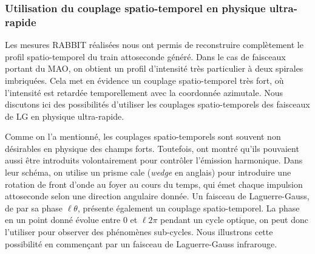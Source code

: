 \subsubsection{Utilisation du couplage spatio-temporel en physique ultra-rapide}
Les mesures RABBIT réalisées nous ont permis de reconstruire complètement le profil spatio-temporel du train attoseconde généré. Dans le cas de faisceaux portant du MAO, on obtient un profil d'intensité très particulier à deux spirales imbriquées. Cela met en évidence un couplage spatio-temporel très fort, où l'intensité est retardée temporellement avec la coordonnée azimutale. Nous discutons ici des possibilités d'utiliser les couplages spatio-temporels des faisceaux de LG en physique ultra-rapide.

Comme on l'a mentionné, les couplages spatio-temporels sont souvent non désirables en physique des champs forts. Toutefois,  ont montré qu'ils pouvaient aussi être introduits volontairement pour contrôler l'émission harmonique. Dans leur schéma, on utilise un prisme cale (\textit{wedge} en anglais) pour introduire une rotation de front d'onde au foyer au cours du temps, qui émet chaque impulsion attoseconde selon une direction angulaire donnée. \linebreak
Un faisceau de Laguerre-Gauss, de par sa phase $\ell\theta$, présente également un couplage spatio-temporel. La phase en un point donné évolue entre 0 et $\ell 2\pi$ pendant un cycle optique, on peut donc l'utiliser pour observer des phénomènes sub-cycles. Nous illustrons cette possibilité en commençant par un faisceau de Laguerre-Gauss infrarouge.

